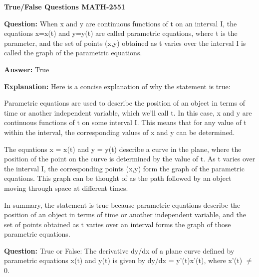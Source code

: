 \documentclass{article}
\begin{document}

\begin{center}
\textbf{\Large True/False Questions MATH-2551} \\ %
\end{center}

\vspace{1cm}






\vspace{1cm}
                \textbf {Question:} When x and y are continuous functions of t on an interval I, the equations x=x(t) and y=y(t) are called parametric equations, where t is the parameter, and the set of points (x,y) obtained as t varies over the interval I is called the graph of the parametric equations.
                
                \textbf{Answer:} True

                \textbf{Explanation:} Here is a concise explanation of why the statement is true:

Parametric equations are used to describe the position of an object in terms of time or another independent variable, which we'll call t. In this case, x and y are continuous functions of t on some interval I. This means that for any value of t within the interval, the corresponding values of x and y can be determined.

The equations x = x(t) and y = y(t) describe a curve in the plane, where the position of the point on the curve is determined by the value of t. As t varies over the interval I, the corresponding points (x,y) form the graph of the parametric equations. This graph can be thought of as the path followed by an object moving through space at different times.

In summary, the statement is true because parametric equations describe the position of an object in terms of time or another independent variable, and the set of points obtained as t varies over an interval forms the graph of those parametric equations.
                
                \vspace{0.5cm} 
        
            
                \textbf {Question:} True or False: The derivative dy/dx of a plane curve defined by parametric equations x(t) and y(t) is given by dy/dx = y'(t)x'(t), where x'(t) \ensuremath{\neq} 0.
                
\end{document}
